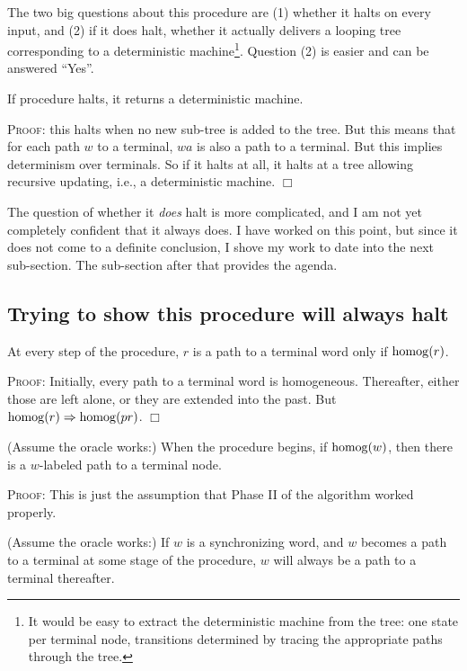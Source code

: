 \documentclass[../new-procedure.tex]{subfiles}
\begin{document}
The two big questions about this procedure are (1) whether it halts on every
input, and (2) if it does halt, whether it actually delivers a looping tree
corresponding to a deterministic machine\footnote{It would be easy to extract
  the deterministic machine from the tree: one state per terminal node,
  transitions determined by tracing the appropriate paths through the tree.}.
Question (2) is easier and can be answered ``Yes''.

\begin{proposition}
  If procedure halts, it returns a deterministic machine.
\end{proposition}

\textsc{Proof}: this halts when no new sub-tree is added to the tree.  But this
means that for each path $w$ to a terminal, $wa$ is also a path to a terminal.
But this implies determinism over terminals.  So if it halts at all, it halts
at a tree allowing recursive updating, i.e., a deterministic machine. $\Box$

The question of whether it {\em does} halt is more complicated, and I am not
yet completely confident that it always does.  I have worked on this point, but
since it does not come to a definite conclusion, I shove my work to date into
the next sub-section.  The sub-section after that provides the agenda.

\subsection{Trying to show this procedure will always halt}

\begin{proposition}
At every step of the procedure, $r$ is a path to a terminal word only if
$\mathrm{homog}(r)$.
\end{proposition}

\textsc{Proof:} Initially, every path to a terminal word is homogeneous.
Thereafter, either those are left alone, or they are extended into the past.
But $\mathrm{homog}(r) \Rightarrow \mathrm{homog}(pr)$.  $\Box$

\begin{proposition}
  (Assume the oracle works:) When the procedure begins, if $\mathrm{homog}(w)$, then
  there is a $w$-labeled path to a terminal node.
\end{proposition}

\textsc{Proof:} This is just the assumption that Phase II of the algorithm
worked properly.

\begin{proposition}
  (Assume the oracle works:) If $w$ is a synchronizing word, and $w$ becomes a
  path to a terminal at some stage of the procedure, $w$ will always be a path
  to a terminal thereafter.
\end{proposition}
\end{document}
